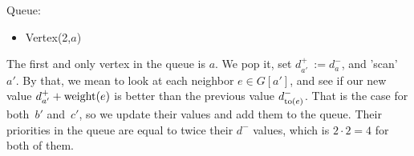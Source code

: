 \begin{minipage}{.75\linewidth}
\end{minipage}\hfill%
\begin{minipage}{.22\linewidth}
    Queue:
    \begin{itemize}
        \item Vertex(2,$a$)
    \end{itemize}
\end{minipage}

The first and only vertex in the queue is $a$. We pop it, set $d^+_{a'}~:= d^-_a$, and 'scan'~$a'$. By that, we mean to look at each neighbor $e \in G[a']$, and see if our new value $d^+_{a'} + \operatorname{weight}(e)$ is better than the previous value $d^-_{\operatorname{to}(e)}$. That is the case for both~$b'$ and~$c'$, so we update their values and add them to the queue. Their priorities in the queue are equal to twice their $d^-$ values, which is $2 \cdot 2 = 4$ for both of them.

